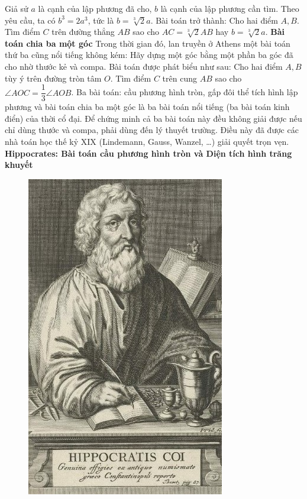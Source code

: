 \begin{multicols}{2}
	\vskip 0.05cm
	Giả sử  $a$ là cạnh của lập phương đã cho,  $b$ là cạnh của lập phương cần tìm. Theo yêu cầu, ta có $b^3 = 2a^3$, tức là $b = \sqrt[3]{2}a$.  Bài toán trở thành: Cho hai điểm $A,B$. Tìm điểm  $C$ trên đường thẳng $AB$  sao cho $AC = \sqrt[3]{2}AB$  hay $b = \sqrt[3]{2}a$.
	\vskip 0.05cm 
	\textbf{\color{lichsutoanhoc}Bài toán chia ba một góc}
	\vskip 0.05cm
	Trong thời gian đó, lan truyền ở Athens một bài toán thứ ba cũng nổi tiếng không kém: Hãy dựng một góc bằng một phần ba góc đã cho nhờ thước kẻ và compa. Bài toán được phát biểu như sau: Cho hai điểm $A,B$ tùy ý trên đường tròn tâm $O$.  Tìm điểm $C$ trên cung $AB$ sao cho $\angle AOC = \dfrac{1}{3} \angle AOB$.
	\vskip 0.05cm  
	Ba bài toán: cầu phương hình tròn, gấp đôi thể tích hình lập phương và bài toán chia ba một góc là ba bài toán nổi tiếng (ba bài toán kinh điển) của thời cổ đại. Để chứng minh cả ba bài toán này đều không giải được nếu chỉ dùng thước và compa, phải dùng đến lý thuyết trường. Điều này đã được các nhà toán học thế kỷ XIX (Lindemann,  Gauss, Wanzel, \ldots) giải quyết trọn vẹn.  
	\vskip 0.05cm
	\textbf{\color{lichsutoanhoc}Hippocrates: Bài toán cầu phương hình tròn  và Diện tích hình trăng khuyết}
	\begin{figure}[H]
		\vspace*{-5pt}
		\centering
		\captionsetup{labelformat= empty, justification=centering}
		\includegraphics[width= 0.65\linewidth]{1}

\end{figure}
\end{multicols}

